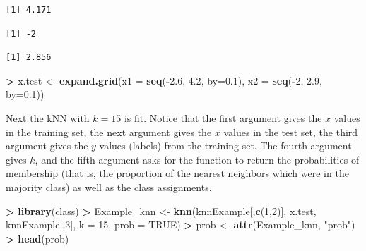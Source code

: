 \documentclass[]{krantz}
\makeatletter
\newenvironment{Shaded}{\begin{snugshade}}{\end{snugshade}}
\newcommand{\KeywordTok}[1]{\textcolor[rgb]{0.27,0.27,0.27}{\textbf{#1}}}
\newcommand{\DataTypeTok}[1]{\textcolor[rgb]{0.27,0.27,0.27}{#1}}
\newcommand{\DecValTok}[1]{\textcolor[rgb]{0.06,0.06,0.06}{#1}}
\newcommand{\FloatTok}[1]{\textcolor[rgb]{0.06,0.06,0.06}{#1}}
\newcommand{\StringTok}[1]{\textcolor[rgb]{0.5,0.5,0.5}{#1}}
\newcommand{\OtherTok}[1]{\textcolor[rgb]{0.37,0.37,0.37}{#1}}
\newcommand{\OperatorTok}[1]{\textcolor[rgb]{0.43,0.43,0.43}{\textbf{#1}}}
\newcommand{\NormalTok}[1]{#1}
\newenvironment{kframe}{%
\medskip{}
\setlength{\fboxsep}{.8em}
 \def\at@end@of@kframe{}%
 \ifinner\ifhmode%
  \def\at@end@of@kframe{\end{minipage}}%
  \begin{minipage}{\columnwidth}%
 \fi\fi%
 \def\FrameCommand##1{\hskip\@totalleftmargin \hskip-\fboxsep
 \colorbox{shadecolor}{##1}\hskip-\fboxsep
     \hskip-\linewidth \hskip-\@totalleftmargin \hskip\columnwidth}%
 \MakeFramed {\advance\hsize-\width
   \@totalleftmargin\z@ \linewidth\hsize
   \@setminipage}}%
 {\par\unskip\endMakeFramed%
 \at@end@of@kframe}
\renewenvironment{Shaded}{\begin{kframe}}{\end{kframe}}
\makeatother
\begin{document}
\begin{verbatim}
[1] 4.171
\end{verbatim}

\begin{Shaded}
\end{Shaded}

\begin{verbatim}
[1] -2
\end{verbatim}

\begin{Shaded}
\end{Shaded}

\begin{verbatim}
[1] 2.856
\end{verbatim}

\begin{Shaded}
\begin{Highlighting}[]
\OperatorTok{>}\StringTok{ }\NormalTok{x.test <-}\StringTok{ }\KeywordTok{expand.grid}\NormalTok{(}\DataTypeTok{x1 =} \KeywordTok{seq}\NormalTok{(}\OperatorTok{-}\FloatTok{2.6}\NormalTok{, }\FloatTok{4.2}\NormalTok{, }\DataTypeTok{by=}\FloatTok{0.1}\NormalTok{), }\DataTypeTok{x2 =} \KeywordTok{seq}\NormalTok{(}\OperatorTok{-}\DecValTok{2}\NormalTok{, }\FloatTok{2.9}\NormalTok{, }\DataTypeTok{by=}\FloatTok{0.1}\NormalTok{))}
\end{Highlighting}
\end{Shaded}

Next the kNN with \(k=15\) is fit. Notice that the first argument gives
the \(x\) values in the training set, the next argument gives the \(x\)
values in the test set, the third argument gives the \(y\) values
(labels) from the training set. The fourth argument gives \(k\), and the
fifth argument asks for the function to return the probabilities of
membership (that is, the proportion of the nearest neighbors which were
in the majority class) as well as the class assignments.

\begin{Shaded}
\begin{Highlighting}[]
\OperatorTok{>}\StringTok{ }\KeywordTok{library}\NormalTok{(class)}
\OperatorTok{>}\StringTok{ }\NormalTok{Example_knn <-}\StringTok{ }\KeywordTok{knn}\NormalTok{(knnExample[,}\KeywordTok{c}\NormalTok{(}\DecValTok{1}\NormalTok{,}\DecValTok{2}\NormalTok{)], x.test, knnExample[,}\DecValTok{3}\NormalTok{], }\DataTypeTok{k =} \DecValTok{15}\NormalTok{, }\DataTypeTok{prob =} \OtherTok{TRUE}\NormalTok{)}
\OperatorTok{>}\StringTok{ }\NormalTok{prob <-}\StringTok{ }\KeywordTok{attr}\NormalTok{(Example_knn, }\StringTok{"prob"}\NormalTok{)}
\OperatorTok{>}\StringTok{ }\KeywordTok{head}\NormalTok{(prob)}
\end{Highlighting}
\end{Shaded}
\end{document}
